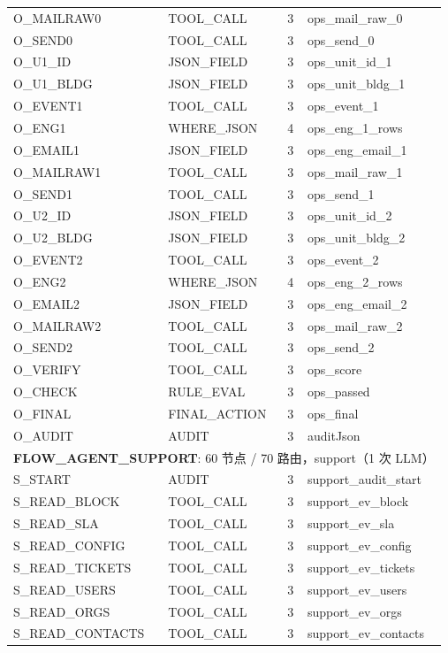 {\begin{longtable}{p{5.0cm}p{3.1cm}p{1.0cm}p{5.0cm}}
O\_MAILRAW0 & TOOL\_CALL & 3 & ops\_mail\_raw\_0 \\
O\_SEND0 & TOOL\_CALL & 3 & ops\_send\_0 \\
O\_U1\_ID & JSON\_FIELD & 3 & ops\_unit\_id\_1 \\
O\_U1\_BLDG & JSON\_FIELD & 3 & ops\_unit\_bldg\_1 \\
O\_EVENT1 & TOOL\_CALL & 3 & ops\_event\_1 \\
O\_ENG1 & WHERE\_JSON & 4 & ops\_eng\_1\_rows \\
O\_EMAIL1 & JSON\_FIELD & 3 & ops\_eng\_email\_1 \\
O\_MAILRAW1 & TOOL\_CALL & 3 & ops\_mail\_raw\_1 \\
O\_SEND1 & TOOL\_CALL & 3 & ops\_send\_1 \\
O\_U2\_ID & JSON\_FIELD & 3 & ops\_unit\_id\_2 \\
O\_U2\_BLDG & JSON\_FIELD & 3 & ops\_unit\_bldg\_2 \\
O\_EVENT2 & TOOL\_CALL & 3 & ops\_event\_2 \\
O\_ENG2 & WHERE\_JSON & 4 & ops\_eng\_2\_rows \\
O\_EMAIL2 & JSON\_FIELD & 3 & ops\_eng\_email\_2 \\
O\_MAILRAW2 & TOOL\_CALL & 3 & ops\_mail\_raw\_2 \\
O\_SEND2 & TOOL\_CALL & 3 & ops\_send\_2 \\
O\_VERIFY & TOOL\_CALL & 3 & ops\_score \\
O\_CHECK & RULE\_EVAL & 3 & ops\_passed \\
O\_FINAL & FINAL\_ACTION & 3 & ops\_final \\
O\_AUDIT & AUDIT & 3 & auditJson \\
\midrule
\multicolumn{4}{l}{\textbf{FLOW\_AGENT\_SUPPORT}: 60 节点 / 70 路由，support（1 次 LLM）} \\
\midrule
S\_START & AUDIT & 3 & support\_audit\_start \\
S\_READ\_BLOCK & TOOL\_CALL & 3 & support\_ev\_block \\
S\_READ\_SLA & TOOL\_CALL & 3 & support\_ev\_sla \\
S\_READ\_CONFIG & TOOL\_CALL & 3 & support\_ev\_config \\
S\_READ\_TICKETS & TOOL\_CALL & 3 & support\_ev\_tickets \\
S\_READ\_USERS & TOOL\_CALL & 3 & support\_ev\_users \\
S\_READ\_ORGS & TOOL\_CALL & 3 & support\_ev\_orgs \\
S\_READ\_CONTACTS & TOOL\_CALL & 3 & support\_ev\_contacts \\

\end{longtable}}
